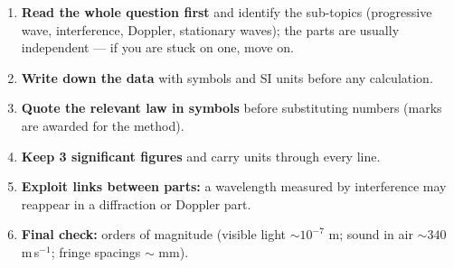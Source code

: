 \documentclass[11pt]{article}
\begin{document}
\begin{methode}
\begin{enumerate}
\item \textbf{Read the whole question first} and identify the sub-topics (progressive wave, interference, Doppler, stationary waves); the parts are usually independent — if you are stuck on one, move on.
\item \textbf{Write down the data} with symbols and SI units before any calculation.
\item \textbf{Quote the relevant law in symbols} before substituting numbers (marks are awarded for the method).
\item \textbf{Keep 3 significant figures} and carry units through every line.
\item \textbf{Exploit links between parts:} a wavelength measured by interference may reappear in a diffraction or Doppler part.
\item \textbf{Final check:} orders of magnitude (visible light $\sim 10^{-7}$ m; sound in air $\sim 340$ m\,s$^{-1}$; fringe spacings $\sim$ mm).
\end{enumerate}
\end{methode}
\end{document}
